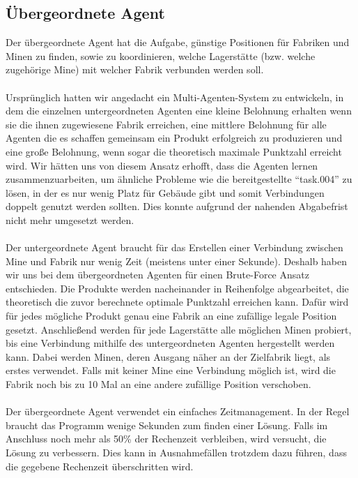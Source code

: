 \subsection{Übergeordnete Agent}
Der übergeordnete Agent hat die Aufgabe, günstige Positionen für Fabriken und Minen zu finden, sowie zu koordinieren, welche Lagerstätte (bzw. welche zugehörige Mine) mit welcher Fabrik verbunden werden soll. 
\\\\
Ursprünglich hatten wir angedacht ein Multi-Agenten-System zu entwickeln, in dem die einzelnen untergeordneten Agenten eine kleine Belohnung erhalten wenn sie die ihnen zugewiesene Fabrik erreichen, eine mittlere Belohnung für alle Agenten die es schaffen gemeinsam ein Produkt erfolgreich zu produzieren und eine große Belohnung, wenn sogar die theoretisch maximale Punktzahl erreicht wird. Wir hätten uns von diesem Ansatz erhofft, dass die Agenten lernen zusammenzuarbeiten, um ähnliche Probleme wie die bereitgestellte “task.004” zu lösen, in der es nur wenig Platz für Gebäude gibt und somit Verbindungen doppelt genutzt werden sollten. Dies konnte aufgrund der nahenden Abgabefrist nicht mehr umgesetzt werden.
\\\\
Der untergeordnete Agent braucht für das Erstellen einer Verbindung zwischen Mine und Fabrik nur wenig Zeit (meistens unter einer Sekunde). Deshalb haben wir uns bei dem übergeordneten Agenten für einen Brute-Force Ansatz entschieden. Die Produkte werden nacheinander in Reihenfolge abgearbeitet, die theoretisch die zuvor berechnete optimale Punktzahl erreichen kann. Dafür wird für jedes mögliche Produkt genau eine Fabrik an eine zufällige legale Position gesetzt. Anschließend werden für jede Lagerstätte alle möglichen Minen probiert, bis eine Verbindung mithilfe des untergeordneten Agenten hergestellt werden kann. Dabei werden Minen, deren Ausgang näher an der Zielfabrik liegt, als erstes verwendet. Falls mit keiner Mine eine Verbindung möglich ist, wird die Fabrik noch bis zu 10 Mal an eine andere zufällige Position verschoben. 
\\\\
Der übergeordnete Agent verwendet ein einfaches Zeitmanagement. In der Regel braucht das Programm wenige Sekunden zum finden einer Lösung. Falls im Anschluss noch mehr als 50\% der Rechenzeit verbleiben, wird versucht, die Lösung zu verbessern. Dies kann in Ausnahmefällen trotzdem dazu führen, dass die gegebene Rechenzeit überschritten wird. 
\\\\
